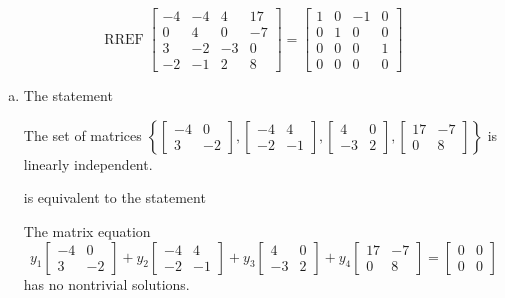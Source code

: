 \begin{exerciseAnswer} 


\[\operatorname{RREF} \left[\begin{array}{cccc}
-4 & -4 & 4 & 17 \\
0 & 4 & 0 & -7 \\
3 & -2 & -3 & 0 \\
-2 & -1 & 2 & 8
\end{array}\right] = \left[\begin{array}{cccc}
1 & 0 & -1 & 0 \\
0 & 1 & 0 & 0 \\
0 & 0 & 0 & 1 \\
0 & 0 & 0 & 0
\end{array}\right] \]


\begin{enumerate}[(a)]
\item The statement 
\begin{center}\begin{minipage}{0.8\textwidth}
 The set of matrices \( \left\{ \left[\begin{array}{cc}
-4 & 0 \\
3 & -2
\end{array}\right] , \left[\begin{array}{cc}
-4 & 4 \\
-2 & -1
\end{array}\right] , \left[\begin{array}{cc}
4 & 0 \\
-3 & 2
\end{array}\right] , \left[\begin{array}{cc}
17 & -7 \\
0 & 8
\end{array}\right] \right\} \) is linearly independent.
\end{minipage}\end{center}
     is equivalent to the statement 
\begin{center}\begin{minipage}{0.8\textwidth}
 The matrix equation \[ y_{1} \left[\begin{array}{cc}
-4 & 0 \\
3 & -2
\end{array}\right] + y_{2} \left[\begin{array}{cc}
-4 & 4 \\
-2 & -1
\end{array}\right] + y_{3} \left[\begin{array}{cc}
4 & 0 \\
-3 & 2
\end{array}\right] + y_{4} \left[\begin{array}{cc}
17 & -7 \\
0 & 8
\end{array}\right] = \left[\begin{array}{cc}
0 & 0 \\
0 & 0
\end{array}\right] \] has no nontrivial solutions. 
\end{minipage}\end{center}
    

\end{enumerate}
\end{exerciseAnswer}
